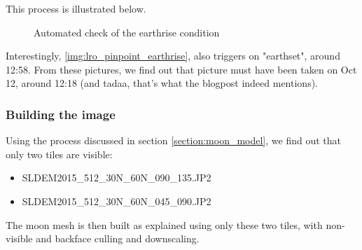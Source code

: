 \documentclass[14pt]{article}
\begin{document}
This process is illustrated below.
\begin{figure}[H]
  \centering
  \qquad
  \caption{Automated check of the earthrise condition}
\end{figure}


Interestingly, \ref{img:lro_pinpoint_earthrise}, also triggers on "earthset", around 12:58.
From these pictures, we find out that picture must have been taken on Oct 12, around 12:18 (and tadaa, that's what the blogpost indeed mentions).

\subsubsection{Building the image}

Using the process discussed in section \ref{section:moon_model}, we find out that only two tiles are visible:
\begin{itemize}
  \item SLDEM2015\_512\_30N\_60N\_090\_135.JP2
  \item SLDEM2015\_512\_30N\_60N\_045\_090.JP2
\end{itemize}

The moon mesh is then built as explained using only these two tiles, with non-visible and backface culling and downscaling.
\end{document}
